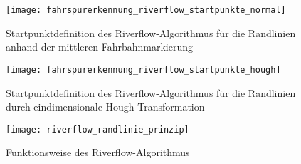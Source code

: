 \begin{figure}[htbp]
	\centering
	\texttt{[image: fahrspurerkennung\_riverflow\_startpunkte\_normal]}
	\caption{Startpunktdefinition des Riverflow-Algorithmus für die Randlinien anhand der mittleren Fahrbahnmarkierung}
	\label{fig:riverflow:randlinien:startpoints:dashedline}
\end{figure}

\begin{figure}[htbp]
	\centering
	\texttt{[image: fahrspurerkennung\_riverflow\_startpunkte\_hough]}
	\caption{Startpunktdefinition des Riverflow-Algorithmus für die Randlinien durch eindimensionale Hough-Transformation}
	\label{fig:riverflow:randlinien:startpoints:hough}
\end{figure}

\begin{figure}[htbp]
  \centering
  \texttt{[image: riverflow\_randlinie\_prinzip]}
  \caption{Funktionsweise des Riverflow-Algorithmus}
  \label{fig:riverflow:randlinie:prinzip}
\end{figure}

